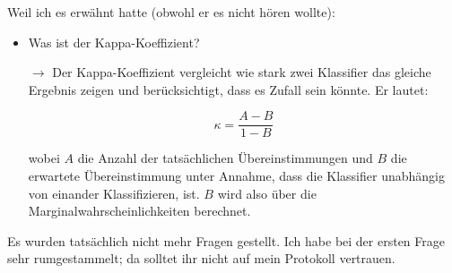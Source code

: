 \documentclass[a4paper]{article}
\begin{document}
    Weil ich es erwähnt hatte (obwohl er es nicht hören wollte):

    \begin{itemize}
        \item Was ist der Kappa-Koeffizient?
        \item[$\rightarrow$] Der Kappa-Koeffizient vergleicht wie stark zwei
                             Klassifier das gleiche Ergebnis zeigen und
                             berücksichtigt, dass es Zufall sein könnte.
                             Er lautet:

                             $$\kappa = \frac{A - B}{1 - B}$$

                             wobei $A$ die Anzahl der tatsächlichen
                             Übereinstimmungen und $B$ die erwartete
                             Übereinstimmung unter Annahme, dass die Klassifier
                             unabhängig von einander Klassifizieren, ist. $B$
                             wird also über die Marginalwahrscheinlichkeiten
                             berechnet.
    \end{itemize}


    Es wurden tatsächlich nicht mehr Fragen gestellt. Ich habe bei der ersten
    Frage sehr rumgestammelt; da solltet ihr nicht auf mein Protokoll
    vertrauen.
\end{document}
